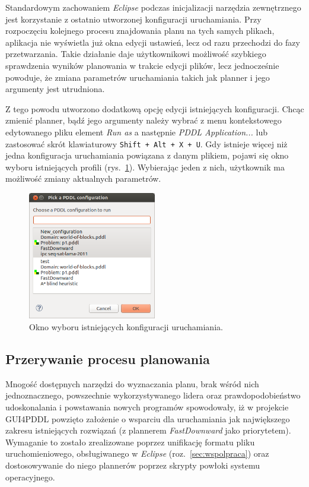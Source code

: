 Standardowym zachowaniem \textit{Eclipse} podczas inicjalizacji narzędzia zewnętrznego jest korzystanie z ostatnio utworzonej konfiguracji uruchamiania. Przy rozpoczęciu kolejnego procesu znajdowania planu na tych samych plikach, aplikacja nie wyświetla już okna edycji ustawień, lecz od razu przechodzi do fazy przetwarzania. Takie działanie daje użytkownikowi możliwość szybkiego sprawdzenia wyników planowania w trakcie edycji plików, lecz jednocześnie powoduje, że zmiana parametrów uruchamiania takich jak planner i jego argumenty jest utrudniona.

Z tego powodu utworzono dodatkową opcję edycji istniejących konfiguracji. Chcąc zmienić planner, bądź jego argumenty należy wybrać z menu kontekstowego edytowanego pliku element \textit{Run as} a następnie \textit{PDDL Application...} lub zastosować skrót klawiaturowy \texttt{Shift~+~Alt~+~X~+~U}. Gdy istnieje więcej niż jedna konfiguracja uruchamiania powiązana z danym plikiem, pojawi się okno wyboru istniejących profili (rys.~\ref{fig:run_configuration_choice}). Wybierając jeden z nich, użytkownik ma możliwość zmiany aktualnych parametrów.

\begin{figure}[h!]
    \centering
    \includegraphics[width=0.5\textwidth]{img/run_configuration_choice}
    \caption{Okno wyboru istniejących konfiguracji uruchamiania.}
    \label{fig:run_configuration_choice}
\end{figure}

\subsection{Przerywanie procesu planowania}
\label{subsec:przerywanie}

Mnogość dostępnych narzędzi do wyznaczania planu, brak wśród nich jednoznacznego, powszechnie wykorzystywanego lidera oraz prawdopodobieństwo udoskonalania i powstawania nowych programów spowodowały, iż w projekcie GUI4PDDL powzięto założenie o wsparciu dla uruchamiania jak największego zakresu istniejących rozwiązań (z plannerem \textit{FastDownward} jako priorytetem). Wymaganie to zostało zrealizowane poprzez unifikację formatu pliku uruchomieniowego, obsługiwanego w \textit{Eclipse} (roz.~\ref{sec:wspolpraca}) oraz dostosowywanie do niego plannerów poprzez skrypty powłoki systemu operacyjnego.

